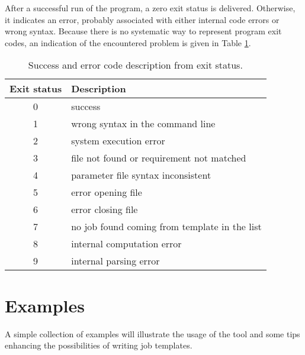 \documentclass[12pt,a4paper]{article}
\newcommand{\tab}[1]{Table \ref{#1}}
\begin{document}
\begin{itemize}
{After a successful run of the program, a zero exit status is delivered. Otherwise, it indicates an error, probably associated with either internal code errors or wrong syntax. Because there is no systematic way to represent program exit codes, an indication of the encountered problem is given in \tab{error}.
\begin{table}
\center
\begin{tabular}{cp{50ex}}
\hline
{Exit status} & {Description}\\
\hline
0 & success\\
1 & wrong syntax in the command line\\
2 & system execution error\\
3 & file not found or requirement not matched\\
4 & parameter file syntax inconsistent\\
5 & error opening file\\
6 & error closing file\\
7 & no job found coming from template in the list\\
8 & internal computation error\\
9 & internal parsing error\\
\hline
\end{tabular}
\caption{Success and error code description from exit status.}
\label{error}
\end{table}

\section{Examples}\label{examples}
A simple collection of examples will illustrate the usage of the tool and some tips enhancing the possibilities of writing job templates.

}
\end{itemize}
\end{document}
